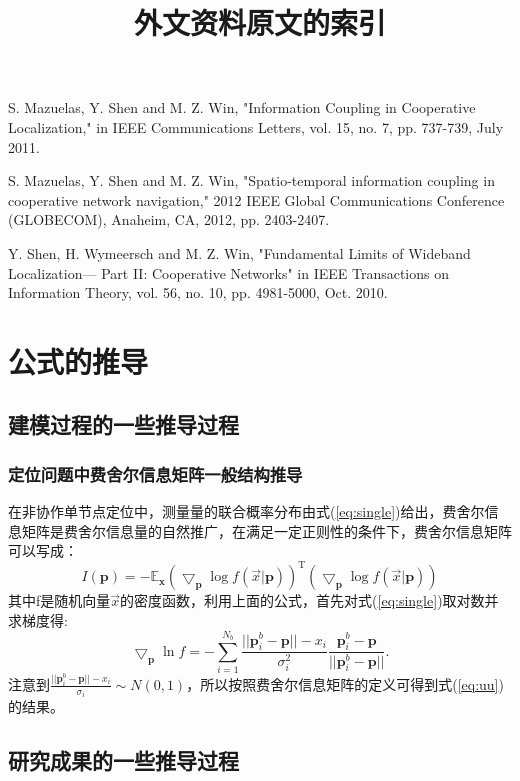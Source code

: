 
\newpage


\title{外文资料原文的索引}
\begin{translationbib}
\item S. Mazuelas, Y. Shen and M. Z. Win, "Information Coupling in Cooperative Localization," in IEEE Communications Letters, vol. 15, no. 7, pp. 737-739, July 2011.
\item S. Mazuelas, Y. Shen and M. Z. Win, "Spatio-temporal information coupling in cooperative network navigation," 2012 IEEE Global Communications Conference (GLOBECOM), Anaheim, CA, 2012, pp. 2403-2407.
\item Y. Shen, H. Wymeersch and M. Z. Win, "Fundamental Limits of Wideband Localization— Part II: Cooperative Networks" in IEEE Transactions on Information Theory, vol. 56, no. 10, pp. 4981-5000, Oct. 2010.
\end{translationbib}
\chapter{公式的推导}
\section{建模过程的一些推导过程}
\subsection{定位问题中费舍尔信息矩阵一般结构推导}\label{A_F_1}
在非协作单节点定位中，测量量的联合概率分布由式(\ref{eq:single})给出，费舍尔信息矩阵是费舍尔信息量的自然推广，在满足一定正则性的条件下，费舍尔信息矩阵可以写成：
\begin{equation}
I(\bm{p})=-\mathbb{E}_{\bm{x}}(\bigtriangledown_{\bm{p}} \log f(\vec{x}|\bm{p}))^{\textrm{T}}(\bigtriangledown_{\bm{p}} \log f(\vec{x}|\bm{p}))
\end{equation}
其中f是随机向量$\vec{x}$的密度函数，利用上面的公式，首先对式(\ref{eq:single})取对数并求梯度得:
\begin{equation}
\bigtriangledown_{\bm{p}}\ln f=-\sum_{i=1}^{N_b}\frac{||\bm{p}_i^b-\bm{p}||-x_i}{\sigma_i^2}\frac{\bm{p}^b_i-\bm{p}}{||\bm{p}^b_i-\bm{p}||}.
\end{equation}
注意到$\frac{||\bm{p}_i^b-\bm{p}||-x_i}{\sigma_i}\sim N(0,1)$，所以按照费舍尔信息矩阵的定义可得到式(\ref{eq:uu})的结果。
\section{研究成果的一些推导过程}
